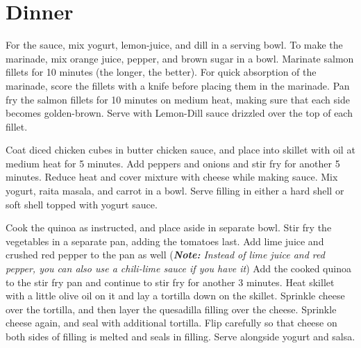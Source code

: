\documentclass[oneside]{recipe}
\begin{document}
\chapter{Dinner}

For the sauce, mix yogurt, lemon-juice, and dill in a serving bowl. 
To make the marinade, mix orange juice, pepper, and brown sugar in a bowl. Marinate salmon fillets for 10 minutes (the longer, the better). For quick absorption of the marinade, score the fillets with a knife before placing them in the marinade. 
Pan fry the salmon fillets for 10 minutes on medium heat, making sure that each side becomes golden-brown. Serve with Lemon-Dill sauce drizzled over the top of each fillet. 


Coat diced chicken cubes in butter chicken sauce, and place into skillet with oil at medium heat for 5 minutes. Add peppers and onions and stir fry for another 5 minutes. Reduce heat and cover mixture with cheese while making sauce.
Mix yogurt, raita masala, and carrot in a bowl. Serve filling in either a hard shell or soft shell topped with yogurt sauce. 


Cook the quinoa as instructed, and place aside in separate bowl. Stir fry the vegetables in a separate pan, adding the tomatoes last. Add lime juice and crushed red pepper to the pan as well (\textit{\textbf{Note: } Instead of lime juice and red pepper, you can also use a chili-lime sauce if you have it}) Add the cooked quinoa to the stir fry pan and continue to stir fry for another 3 minutes. Heat skillet with a little olive oil on it and lay a tortilla down on the skillet. Sprinkle cheese over the tortilla, and then layer the quesadilla filling over the cheese. Sprinkle cheese again, and seal with additional tortilla. Flip carefully so that cheese on both sides of filling is melted and seals in filling. Serve alongside yogurt and salsa. 
\end{document}

